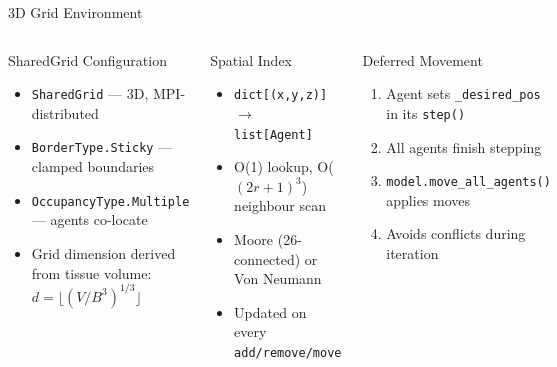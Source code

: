 \documentclass[aspectratio=169,10pt]{beamer}
\begin{document}
\begin{frame}{3D Grid Environment}
  \begin{columns}[T]
    \begin{block}{SharedGrid Configuration}
      \begin{itemize}
        \item \texttt{SharedGrid} --- 3D, MPI-distributed
        \item \texttt{BorderType.Sticky} --- clamped boundaries
        \item \texttt{OccupancyType.Multiple} --- agents co-locate
        \item Grid dimension derived from tissue volume: \\
              $d = \lfloor (V / B^3)^{1/3} \rfloor$
      \end{itemize}
    \end{block}
    \begin{block}{Spatial Index}
      \begin{itemize}
        \item \texttt{dict[(x,y,z)] $\to$ list[Agent]}
        \item O(1) lookup, O($(2r+1)^3$) neighbour scan
        \item Moore (26-connected) or Von Neumann
        \item Updated on every \texttt{add/remove/move}
      \end{itemize}
    \end{block}

    \begin{block}{Deferred Movement}
      \begin{enumerate}
        \item Agent sets \texttt{\_desired\_pos} in its \texttt{step()}
        \item All agents finish stepping
        \item \texttt{model.move\_all\_agents()} applies moves
        \item Avoids conflicts during iteration
      \end{enumerate}
    \end{block}
    \vspace{0.3em}
    \centering
  \end{columns}
\end{frame}
\end{document}

